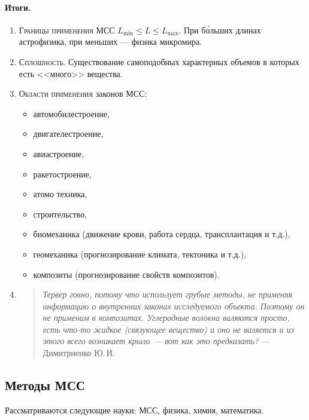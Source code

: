     \paragraph{Итоги.}
    \begin{enumerate}
      \item \textsc{Границы применения} МСС $L_{\min} \leqslant L \leqslant
        L_{\max}$. При б\'{о}льших
        длинах астрофизика, при меньших --- физика микромира.

      \item \textsc{Сплошность.} Существование самоподобных характерных объемов
        в которых есть <<много>>
        вещества.

      \item \textsc{Области применения} законов МСС:
        \begin{itemize}[label=--]
          \item автомобилестроение,
          \item двигателестроение,
          \item авиастроение,
          \item ракетостроение,
          \item атомо техника,
          \item строительство,
          \item биомеханика (движение крови, работа сердца, трансплантация и
            т.д.),
          \item геомеханика (прогнозирование климата, тектоника и т.д.),
          \item композиты (прогнозирование свойств композитов).
        \end{itemize}
        \item
		  \begin{quotation}
				\emph{Тервер говно, потому что использует грубые методы, не применяя информацию о внутренних
				законах исследуемого объекта. Поэтому он не применим в композитах. Углеродные волокна 
				валяются просто, есть что-то жидкое (связующее вещество) и оно не валяется и из этого 
      всего возникает крыло --- вот как это предказать?}
				\flushright--- Димитриенко Ю.\,И.
			\end{quotation}
    \end{enumerate}


\subsection{Методы МСС}
Рассматриваются следующие науки: МСС, физика, химия, математика.

